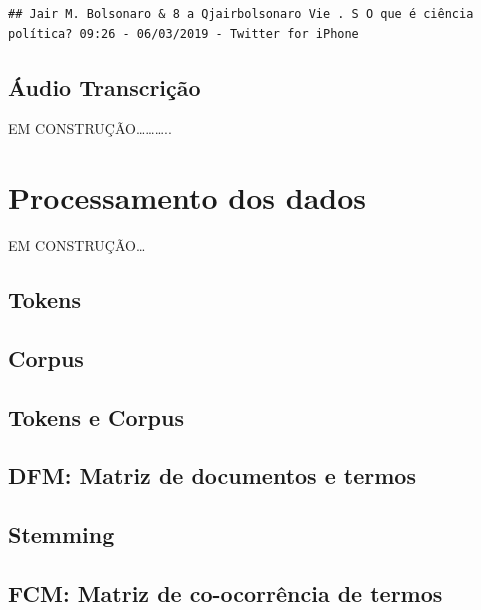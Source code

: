 \documentclass[]{book}
\begin{document}
\begin{verbatim}
## Jair M. Bolsonaro & 8 a Qjairbolsonaro Vie . S O que é ciência política? 09:26 - 06/03/2019 - Twitter for iPhone
\end{verbatim}

\hypertarget{uxe1udio-transcriuxe7uxe3o}{%
\section{Áudio Transcrição}\label{uxe1udio-transcriuxe7uxe3o}}

EM CONSTRUÇÃO\ldots{}\ldots{}\ldots{}..

\hypertarget{processamento}{%
\chapter{Processamento dos dados}\label{processamento}}

EM CONSTRUÇÃO\ldots{}

\hypertarget{tokens}{%
\section{Tokens}\label{tokens}}

\hypertarget{corpus}{%
\section{Corpus}\label{corpus}}

\hypertarget{tokens-e-corpus}{%
\section{Tokens e Corpus}\label{tokens-e-corpus}}

\hypertarget{dfm-matriz-de-documentos-e-termos}{%
\section{DFM: Matriz de documentos e termos}\label{dfm-matriz-de-documentos-e-termos}}

\hypertarget{stemming}{%
\section{Stemming}\label{stemming}}

\hypertarget{fcm-matriz-de-co-ocorruxeancia-de-termos}{%
\section{FCM: Matriz de co-ocorrência de termos}\label{fcm-matriz-de-co-ocorruxeancia-de-termos}}
\end{document}
